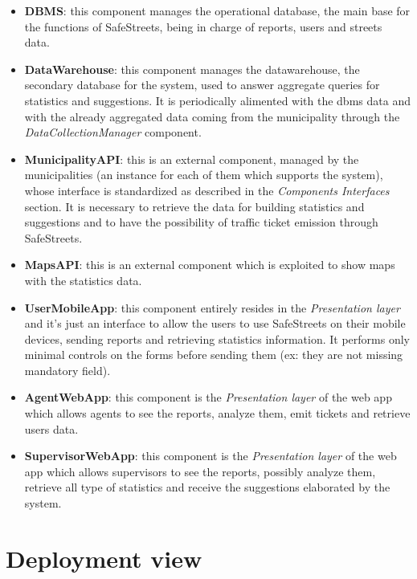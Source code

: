 \documentclass[a4paper]{report}
\begin{document}
\begin{itemize}
\item \textbf{DBMS}: this component manages the operational database, the main base for the functions of SafeStreets, being in charge of reports, users and streets data.

\item \textbf{DataWarehouse}: this component manages the datawarehouse, the secondary database for the system, used to answer aggregate queries for statistics and suggestions. It is periodically alimented with the dbms data and with the already aggregated data coming from the municipality through the \textit{DataCollectionManager} component.

\item \textbf{MunicipalityAPI}: this is an external component, managed by the municipalities (an instance for each of them which supports the system), whose interface is standardized as described in the \textit{Components Interfaces} section. It is necessary to retrieve the data for building statistics and suggestions and to have the possibility of traffic ticket emission through SafeStreets.

\item \textbf{MapsAPI}: this is an external component which is exploited to show maps with the statistics data.

\item \textbf{UserMobileApp}: this component entirely resides in the \textit{Presentation layer} and it's just an interface to allow the users to use SafeStreets on their mobile devices, sending reports and retrieving statistics information. It performs only minimal controls on the forms before sending them (ex: they are not missing mandatory field).

\item \textbf{AgentWebApp}: this component is the \textit{Presentation layer} of the web app which allows agents to see the reports, analyze them, emit tickets and retrieve users data.

\item \textbf{SupervisorWebApp}: this component is the \textit{Presentation layer} of the web app which allows supervisors to see the reports, possibly analyze them, retrieve all type of statistics and receive the suggestions elaborated by the system. 



\end{itemize}

\section{Deployment view}
\end{document}

